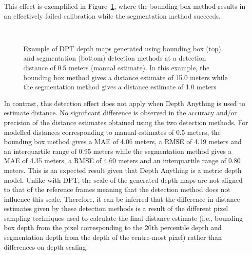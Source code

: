 This effect is exemplified in Figure~\ref{fig:bbox_vs_seg_close_dpt}, where the bounding box
method results in an effectively failed calibration while the segmentation method succeeds.

\begin{figure}[htbp]
    \centering
    \\[1mm]
    \caption{Example of DPT depth maps generated using bounding box (top) and segmentation
        (bottom) detection methods at a detection distance of 0.5 meters (manual estimate).
        In this example, the bounding box method gives a distance estimate of 15.0 meters
        while the segmentation method gives a distance estimate of 1.0 meters}
    \label{fig:bbox_vs_seg_close_dpt}
\end{figure}

In contrast, this detection effect does not apply when Depth Anything is used to estimate
distance.
No significant difference is observed in the accuracy and/or precision of the distance
estimates obtained using the two detection methods.
For modelled distances corresponding to manual estimates of 0.5 meters, the bounding box
method gives a MAE of 4.06 meters, a RMSE of 4.19 meters and an interquartile range of 0.95
meters while the segmentation method gives a MAE of 4.35 meters, a RMSE of 4.60 meters and
an interquartile range of 0.80 meters.
This is an expected result given that Depth Anything is a metric depth model.
Unlike with DPT, the scale of the generated depth maps are not aligned to that of the reference
frames meaning that the detection method does not influence this scale.
Therefore, it can be inferred that the difference in distance estimates given by these detection
methods is a result of the different pixel sampling techniques used to calculate the final distance
estimate (i.e., bounding box depth from the pixel corresponding to the 20th percentile depth
and segmentation depth from the depth of the centre-most pixel) rather than differences on depth
scaling.

